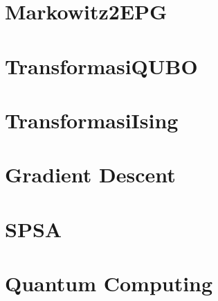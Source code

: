 \documentclass{article}
\begin{document}
\section*{Markowitz2EPG}


\section*{TransformasiQUBO}


\section*{TransformasiIsing}


\section*{Gradient Descent}


\section*{SPSA}


\section*{Quantum Computing}

\end{document}
